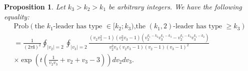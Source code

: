 \documentclass[11pt,reqno]{amsart}
\newtheorem{prop}[thm]{Proposition}
\theoremstyle{definition}
\theoremstyle{remark}
\theoremstyle{remark}
\def\geq{\geqslant}
\renewcommand\ge{\geq}
\newcommand{\ii}{{\mathbf i}}
\numberwithin{equation}{section}
\begin{document}
	\begin{prop}
		\label{prop:2leaders-2}
		Let $k_3 > k_2 >k_1$ be arbitrary integers. We have the following equality:
		\begin{multline*}
			\mathrm{Prob} \left( \mbox{the $k_1$-leader has type $\in [k_2;k_3)$,} \mbox{the $(k_1, 2)$-leader has type $\ge k_3$} \right) 
			\\ = \frac{1}{(2 \pi \ii)^2} \oint_{|v_2|=2} \oint_{|v_3|=2} \frac{(v_2 v_3^2-1)(v_2^2 v_3-1) \left( v_2^{k_1-k_2} v_3^{k_1-k_3} - v_2^{k_1-k_3} v_3^{k_1-k_2} \right) }{ v_2^2 v_3 (v_2 v_3-1) (v_2-1) (v_3-1)^2 } \\ \times \exp \left( t \left( \frac{1}{v_2 v_3} + v_2 + v_3 - 3 \right) \right) d v_2 d v_3.
		\end{multline*}
		
	\end{prop}
	
\end{document}
